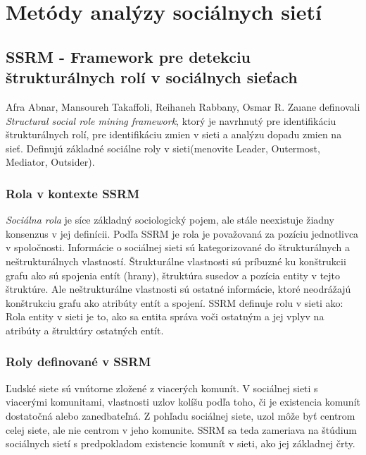 \documentclass[slovak,master,public,dept460,male,cpdeclaration,oneside]{diploma}
\begin{document}
\section{Metódy analýzy sociálnych sietí}

\subsection{SSRM - Framework pre detekciu štrukturálnych rolí v sociálnych sieťach}

Afra Abnar, Mansoureh Takaffoli, Reihaneh Rabbany, Osmar R. Zaıane \cite{9} definovali \textit{Structural social role mining framework}, ktorý je navrhnutý pre identifikáciu štrukturálnych rolí, pre identifikáciu zmien v sieti a analýzu dopadu zmien na sieť. Definujú základné sociálne roly v sieti(menovite Leader, Outermost, Mediator, Outsider). 

\subsubsection{Rola v kontexte SSRM}
\textit{Sociálna rola} je síce základný sociologický pojem, ale stále neexistuje žiadny konsenzus v jej definícii. Podľa SSRM je rola je považovaná za pozíciu jednotlivca v spoločnosti.
 Informácie o sociálnej sieti sú kategorizované do štrukturálnych a neštrukturálnych vlastností. Štrukturálne vlastnosti sú príbuzné ku konštrukcii grafu ako sú spojenia entít (hrany), štruktúra susedov a pozícia entity v tejto štruktúre. Ale neštrukturálne vlastnosti sú ostatné informácie, ktoré neodrážajú konštrukciu grafu ako atribúty entít a spojení. SSRM definuje rolu v sieti ako: Rola entity v sieti je to, ako sa entita správa voči ostatným a jej vplyv na atribúty a štruktúry ostatných entít.


\subsubsection{Roly definované v SSRM}
Ľudské siete sú vnútorne zložené z viacerých komunít. V sociálnej sieti s viacerými komunitami, vlastnosti uzlov kolíšu podľa toho, či je existencia komunít dostatočná alebo zanedbateľná. Z pohľadu sociálnej siete, uzol môže byť centrom celej siete, ale nie centrom v jeho komunite. SSRM sa teda zameriava na štúdium sociálnych sietí s predpokladom existencie komunít v sieti, ako jej základnej črty.
\end{document}
